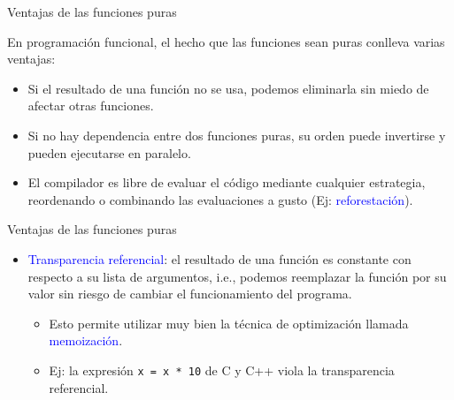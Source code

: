 \documentclass{beamer} %
\newcommand{\blue}[1]{\textcolor{blue}{#1}}
\begin{document}
\begin{frame}{Ventajas de las funciones puras}
    
    En programación funcional, el hecho que las funciones sean puras conlleva varias ventajas:
    \begin{itemize}
        \item<1-> Si el resultado de una función no se usa, podemos eliminarla sin miedo de afectar otras funciones.
        \item<2-> Si no hay dependencia entre dos funciones puras, su orden puede invertirse y pueden ejecutarse en paralelo.
        \item<3-> El compilador es libre de evaluar el código mediante cualquier estrategia, reordenando o combinando las evaluaciones a gusto (Ej: \blue{reforestación}).
    \end{itemize}
\end{frame}

\begin{frame}{Ventajas de las funciones puras}
    \begin{itemize}
        \item<1-> \blue{Transparencia referencial}: el resultado de una función es constante con respecto a su lista de argumentos, i.e., podemos reemplazar la función por su valor sin riesgo de cambiar el funcionamiento del programa.
        \begin{itemize}
            \item<2-> Esto permite utilizar muy bien la técnica de optimización llamada \blue{memoización}.
            \item<3-> Ej: la expresión \texttt{x = x * 10} de C y C++ viola la transparencia referencial.
        \end{itemize}
    \end{itemize}
\end{frame}
\end{document}
